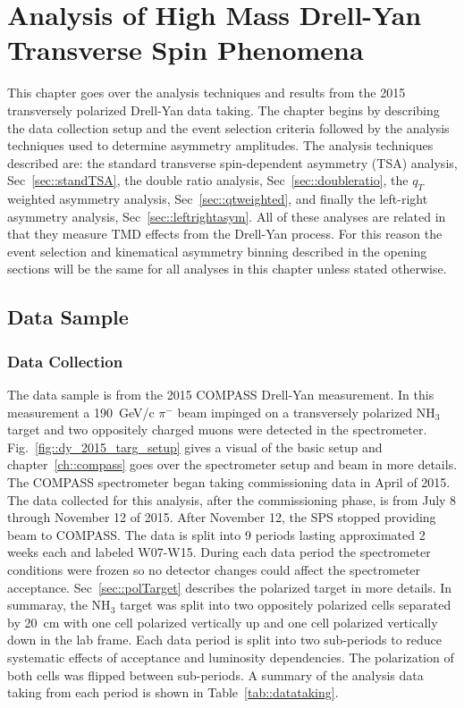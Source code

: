\chapter{Analysis of High Mass Drell-Yan Transverse Spin Phenomena}
\label{ch::hmanalysis}
\ifpdf
\graphicspath{{Chapters/HMAnalysis/Figs/}}
\fi

This chapter goes over the analysis techniques and results from the 2015
transversely polarized Drell-Yan data taking.  The chapter begins by describing
the data collection setup and the event selection criteria followed by the
analysis techniques used to determine asymmetry amplitudes.  The analysis
techniques described are: the standard transverse spin-dependent asymmetry (TSA)
analysis, Sec~\ref{sec::standTSA}, the double ratio analysis,
Sec~\ref{sec::doubleratio}, the $q_T$ weighted asymmetry analysis,
Sec~\ref{sec::qtweighted}, and finally the left-right asymmetry analysis,
Sec~\ref{sec::leftrightasym}.  All of these analyses are related in that they
measure TMD effects from the Drell-Yan process.  For this reason the event
selection and kinematical asymmetry binning described in the opening sections
will be the same for all analyses in this chapter unless stated otherwise.

\section{Data Sample} \label{sec::datasample}

\subsection{Data Collection} \label{sec::datacollection}

The data sample is from the 2015 COMPASS Drell-Yan measurement.  In this
measurement a 190~GeV/c $\pi^-$ beam impinged on a transversely polarized NH$_3$
target and two oppositely charged muons were detected in the spectrometer.
Fig.~\ref{fig::dy_2015_targ_setup} gives a visual of the basic setup and
chapter~\ref{ch::compass} goes over the spectrometer setup and beam in more
details.  The COMPASS spectrometer began taking commissioning data in April of
2015.  The data collected for this analysis, after the commissioning phase, is
from July 8 through November 12 of 2015.  After November 12, the SPS stopped
providing beam to COMPASS.  The data is split into 9 periods lasting
approximated 2 weeks each and labeled W07-W15.  During each data period the
spectrometer conditions were frozen so no detector changes could affect the
spectrometer acceptance.  Sec~\ref{sec::polTarget} describes the polarized
target in more details.  In summaray, the NH$_3$ target was split into two
oppositely polarized cells separated by 20~cm with one cell polarized vertically
up and one cell polarized vertically down in the lab frame.  Each data period is
split into two sub-periods to reduce systematic effects of acceptance and
luminosity dependencies.  The polarization of both cells was flipped between
sub-periods.  A summary of the analysis data taking from each period is shown in
Table~\ref{tab::datataking}.

